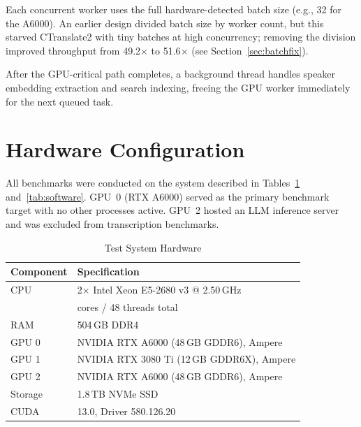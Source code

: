 \documentclass[conference,10pt]{IEEEtran}
\begin{document}
Each concurrent worker uses the full hardware-detected batch size (e.g., 32 for
the A6000). An earlier design divided batch size by worker count, but this
starved CTranslate2 with tiny batches at high concurrency; removing the division
improved throughput from 49.2$\times$ to 51.6$\times$ (see
Section~\ref{sec:batchfix}).

After the GPU-critical path completes, a background thread handles speaker
embedding extraction and search indexing, freeing the GPU worker immediately
for the next queued task.

\section{Hardware Configuration}

All benchmarks were conducted on the system described in
Tables~\ref{tab:hardware} and~\ref{tab:software}. GPU~0 (RTX A6000) served
as the primary benchmark target with no other processes active. GPU~2 hosted
an LLM inference server and was excluded from transcription benchmarks.

\begin{table}[!t]
\centering
\caption{Test System Hardware}
\label{tab:hardware}
\begin{tabular}{@{}ll@{}}
\toprule
\textbf{Component} & \textbf{Specification} \\
\midrule
CPU        & 2$\times$ Intel Xeon E5-2680 v3 @ 2.50\,GHz \\
           & \quad 24 cores / 48 threads total \\
RAM        & 504\,GB DDR4 \\
GPU 0      & NVIDIA RTX A6000 (48\,GB GDDR6), Ampere \\
GPU 1      & NVIDIA RTX 3080 Ti (12\,GB GDDR6X), Ampere \\
GPU 2      & NVIDIA RTX A6000 (48\,GB GDDR6), Ampere \\
Storage    & 1.8\,TB NVMe SSD \\
CUDA       & 13.0, Driver 580.126.20 \\
\bottomrule
\end{tabular}
\end{table}
\end{document}
